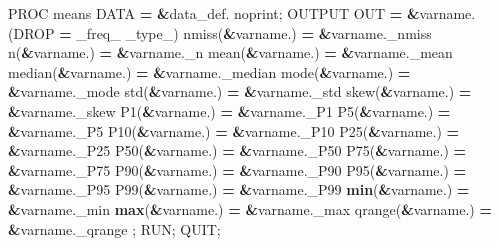 \documentclass[]{article}
\newenvironment{Shaded}{\begin{snugshade}}{\end{snugshade}}
\newcommand{\KeywordTok}[1]{\textcolor[rgb]{0.13,0.29,0.53}{\textbf{{#1}}}}
\newcommand{\NormalTok}[1]{{#1}}
\begin{document}
\begin{Shaded}
\begin{Highlighting}[]
{{{{{{{{{\NormalTok{%
    \NormalTok{PROC means DATA }\KeywordTok{=} \KeywordTok{&}\NormalTok{data_def. noprint;}
    \NormalTok{OUTPUT OUT }\KeywordTok{=} \KeywordTok{&}\NormalTok{varname. (DROP }\KeywordTok{=} \NormalTok{_freq_ _type_)}
        \NormalTok{nmiss(}\KeywordTok{&}\NormalTok{varname.)    }\KeywordTok{=} \KeywordTok{&}\NormalTok{varname._nmiss}
        \NormalTok{n(}\KeywordTok{&}\NormalTok{varname.)        }\KeywordTok{=} \KeywordTok{&}\NormalTok{varname._n}
        \NormalTok{mean(}\KeywordTok{&}\NormalTok{varname.)     }\KeywordTok{=} \KeywordTok{&}\NormalTok{varname._mean}
        \NormalTok{median(}\KeywordTok{&}\NormalTok{varname.)   }\KeywordTok{=} \KeywordTok{&}\NormalTok{varname._median}
        \NormalTok{mode(}\KeywordTok{&}\NormalTok{varname.)     }\KeywordTok{=} \KeywordTok{&}\NormalTok{varname._mode}
        \NormalTok{std(}\KeywordTok{&}\NormalTok{varname.)      }\KeywordTok{=} \KeywordTok{&}\NormalTok{varname._std}
        \NormalTok{skew(}\KeywordTok{&}\NormalTok{varname.)     }\KeywordTok{=} \KeywordTok{&}\NormalTok{varname._skew}
        \NormalTok{P1(}\KeywordTok{&}\NormalTok{varname.)       }\KeywordTok{=} \KeywordTok{&}\NormalTok{varname._P1}
        \NormalTok{P5(}\KeywordTok{&}\NormalTok{varname.)       }\KeywordTok{=} \KeywordTok{&}\NormalTok{varname._P5}
        \NormalTok{P10(}\KeywordTok{&}\NormalTok{varname.)      }\KeywordTok{=} \KeywordTok{&}\NormalTok{varname._P10}
        \NormalTok{P25(}\KeywordTok{&}\NormalTok{varname.)      }\KeywordTok{=} \KeywordTok{&}\NormalTok{varname._P25}
        \NormalTok{P50(}\KeywordTok{&}\NormalTok{varname.)      }\KeywordTok{=} \KeywordTok{&}\NormalTok{varname._P50}
        \NormalTok{P75(}\KeywordTok{&}\NormalTok{varname.)      }\KeywordTok{=} \KeywordTok{&}\NormalTok{varname._P75}
        \NormalTok{P90(}\KeywordTok{&}\NormalTok{varname.)      }\KeywordTok{=} \KeywordTok{&}\NormalTok{varname._P90}
        \NormalTok{P95(}\KeywordTok{&}\NormalTok{varname.)      }\KeywordTok{=} \KeywordTok{&}\NormalTok{varname._P95}
        \NormalTok{P99(}\KeywordTok{&}\NormalTok{varname.)      }\KeywordTok{=} \KeywordTok{&}\NormalTok{varname._P99}
        \KeywordTok{min}\NormalTok{(}\KeywordTok{&}\NormalTok{varname.)      }\KeywordTok{=} \KeywordTok{&}\NormalTok{varname._min}
        \KeywordTok{max}\NormalTok{(}\KeywordTok{&}\NormalTok{varname.)      }\KeywordTok{=} \KeywordTok{&}\NormalTok{varname._max}
        \NormalTok{qrange(}\KeywordTok{&}\NormalTok{varname.)   }\KeywordTok{=} \KeywordTok{&}\NormalTok{varname._qrange}
        \NormalTok{;}
    \NormalTok{RUN; QUIT;}
\NormalTok{%

}}}}}}}}}}}
\end{Highlighting}
\end{Shaded}
\end{document}
